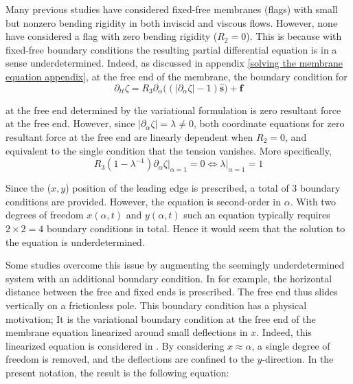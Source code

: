 \documentclass{article}[12pt]
\theoremstyle{Theorem}
\begin{document}
Many previous studies have considered fixed-free membranes (flags) with small but nonzero bending rigidity in both inviscid \cite{alben2022dynamics, shelley2011flapping} and viscous \cite{connell2007flapping} flows. However, none have considered a flag with zero bending rigidity ($R_2 = 0$). This is because with fixed-free boundary conditions the resulting partial differential equation is in a sense underdetermined. Indeed, as discussed in appendix \ref{solving the membrane equation appendix}, at the free end of the membrane, the boundary condition for 
\begin{equation}
    \partial_{tt}\zeta = R_3\partial_\alpha\big((|\partial_\alpha \zeta|-1)\hat{\boldsymbol{s}}\big) + \boldsymbol{f}
    \label{fixed free membrane equation}
\end{equation}

at the free end determined by the variational formulation is zero resultant force at the free end. However, since $|\partial_\alpha\zeta| = \lambda \not=0$, both coordinate equations for zero resultant force at the free end are linearly dependent when $R_2 = 0$, and equivalent to the single condition that the tension vanishes. More specifically,
\begin{equation}
    R_3(1-\lambda^{-1})\partial_\alpha\zeta  \big|_{\alpha = 1}= 0 \iff \lambda|_{\alpha = 1} = 1 \label{fixed free boundary condition}
\end{equation}

Since the ($x,y$) position of the leading edge is prescribed, a total of 3 boundary conditions are provided. However, the equation is second-order in $\alpha$. With two degrees of freedom $x(\alpha,t)$ and $y(\alpha,t)$ such an equation typically requires $2\times2 = 4$ boundary conditions in total. Hence it would seem that the solution to the equation is underdetermined.
\newline

Some studies overcome this issue by augmenting the seemingly underdetermined system with an additional boundary condition. In \cite{mavroyiakoumou2020large, mavroyiakoumou2022membrane} for example, the horizontal distance between the free and fixed ends is prescribed. The free end thus slides vertically on a frictionless pole. This boundary condition has a physical motivation; It is the variational boundary condition at the free end of the membrane equation linearized around small deflections in $x$. Indeed, this linearized equation is considered in \cite{manela2017hanging}. By considering $x \approx \alpha$, a single degree of freedom is removed, and the deflections are confined to the $y$-direction. In the present notation, the result is the following equation:
\end{document}
